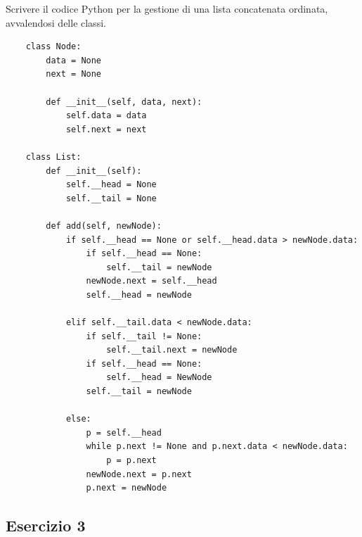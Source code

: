 \documentclass{article}
\numberwithin{equation}{section}
\begin{document}
Scrivere il codice Python per la gestione di una lista concatenata ordinata, avvalendosi delle classi. \\
\begin{verbatim}
    class Node:
        data = None
        next = None
        
        def __init__(self, data, next):
            self.data = data
            self.next = next

    class List:
        def __init__(self):
            self.__head = None
            self.__tail = None

        def add(self, newNode):            
            if self.__head == None or self.__head.data > newNode.data:
                if self.__head == None:
                    self.__tail = newNode
                newNode.next = self.__head
                self.__head = newNode

            elif self.__tail.data < newNode.data:
                if self.__tail != None:
                    self.__tail.next = newNode
                if self.__head == None:
                    self.__head = NewNode
                self.__tail = newNode

            else:            
                p = self.__head
                while p.next != None and p.next.data < newNode.data:
                    p = p.next
                newNode.next = p.next
                p.next = newNode
\end{verbatim}

\subsection{Esercizio 3}
\end{document}
